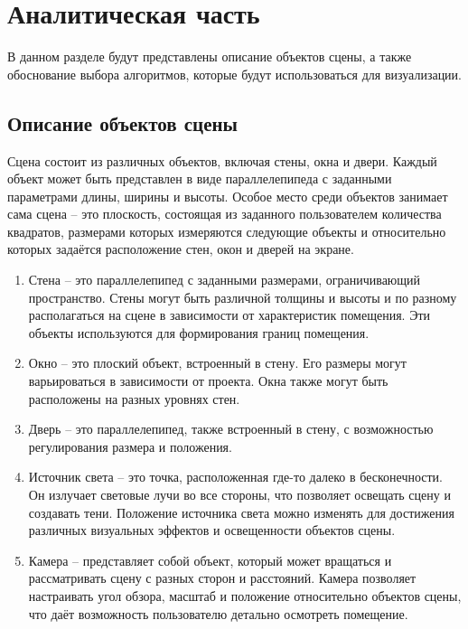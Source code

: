 \section{Аналитическая часть}

\hspace{1.25cm}
В данном разделе будут представлены описание объектов сцены, а также обоснование выбора алгоритмов, которые будут использоваться для визуализации.

\subsection{Описание объектов сцены}

\hspace{1.25cm}
Сцена состоит из различных объектов, включая стены, окна и двери. Каждый объект может быть представлен в виде параллелепипеда с заданными параметрами длины, ширины и высоты. Особое место среди объектов занимает сама сцена -- это плоскость, состоящая из заданного пользователем количества квадратов, размерами которых измеряются следующие объекты и относительно которых задаётся расположение стен, окон и дверей на экране.

\begin{enumerate}
\item Стена -- это параллелепипед с заданными размерами, ограничивающий пространство. Стены могут быть различной толщины и высоты и по разному располагаться на сцене в зависимости от характеристик помещения. Эти объекты используются для формирования границ помещения.

\item Окно -- это плоский объект, встроенный в стену. Его размеры могут варьироваться в зависимости от проекта. Окна также могут быть расположены на разных уровнях стен.

\item Дверь -- это параллелепипед, также встроенный в стену, с возможностью регулирования размера и положения.

\item Источник света -- это точка, расположенная где-то далеко в бесконечности. Он излучает световые лучи во все стороны, что позволяет освещать сцену и создавать тени. Положение источника света можно изменять для достижения различных визуальных эффектов и освещенности объектов сцены.

\item Камера -- представляет собой объект, который может вращаться и рассматривать сцену с разных сторон и расстояний. Камера позволяет настраивать угол обзора, масштаб и положение относительно объектов сцены, что даёт возможность пользователю детально осмотреть помещение.
\end{enumerate}

